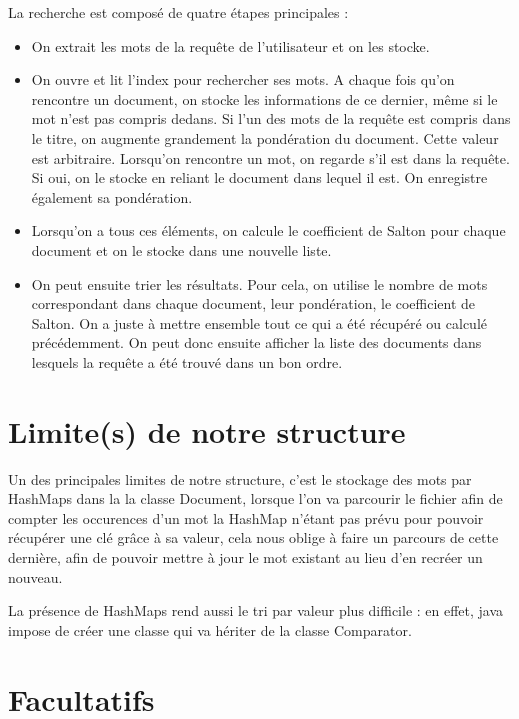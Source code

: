 \documentclass{article}
\begin{document}
La recherche est composé de quatre étapes principales :
\begin{itemize}
     \item On extrait les mots de la requête de l'utilisateur et on les stocke.
     \item On ouvre et lit l'index pour rechercher ses mots. A chaque fois qu'on rencontre un document, on stocke les informations de ce dernier, même si le mot n'est pas compris dedans.
	  Si l'un des mots de la requête est compris dans le titre, on augmente grandement la pondération du document. Cette valeur est arbitraire.
	  Lorsqu'on rencontre un mot, on regarde s'il est dans la requête. Si oui, on le stocke en reliant le document dans lequel il est. On enregistre également sa pondération.
     \item Lorsqu'on a tous ces éléments, on calcule le coefficient de Salton pour chaque document et on le stocke dans une nouvelle liste.
     \item On peut ensuite trier les résultats. Pour cela, on utilise le nombre de mots correspondant dans chaque document, leur pondération, le coefficient de Salton.
	  On a juste à mettre ensemble tout ce qui a été récupéré ou calculé précédemment. On peut donc ensuite afficher la liste des documents dans lesquels la requête a été trouvé dans un bon ordre.
\end{itemize}



\section{Limite(s) de notre structure}

Un des principales limites de notre structure, c'est le stockage des mots par HashMaps dans la
la classe Document, lorsque l'on va parcourir le fichier afin de compter les occurences d'un
mot la HashMap n'étant pas prévu pour pouvoir récupérer une clé grâce à sa valeur, cela nous
oblige à faire un parcours de cette dernière, afin de pouvoir mettre à jour le mot existant
au lieu d'en recréer un nouveau.

La présence de HashMaps rend aussi le tri par valeur plus difficile : en effet, java impose de créer
une classe qui va hériter de la classe Comparator.



\section{Facultatifs}
\end{document}
